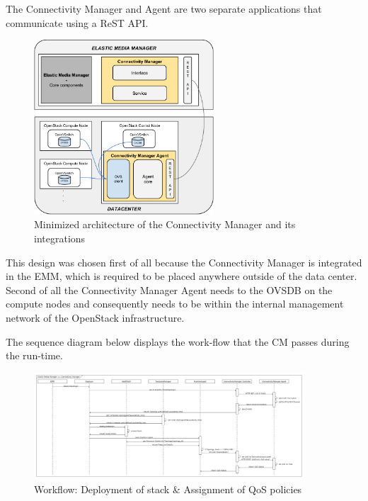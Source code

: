 The Connectivity Manager and Agent are two separate applications that communicate using a ReST API. 

\begin{figure}[H]
\centering

\includegraphics[width=0.6\textwidth]{images/design/modular_architecture_cm_cma}

\caption{Minimized architecture of the Connectivity Manager and its integrations}
\end{figure}

This design was chosen first of all because the Connectivity Manager is integrated in the EMM, which is required to be placed anywhere outside of the data center. Second of all the Connectivity Manager Agent needs to  the OVSDB on the compute nodes and consequently needs to be within the internal management network of the OpenStack infrastructure.

The sequence diagram below displays the work-flow that the CM passes during the run-time.

\begin{figure}[H]
\centering

\includegraphics[width=0.9\textwidth]{images/design/sequence_diagram}

\caption{Workflow: Deployment of stack \& Assignment of QoS policies}
\end{figure}

